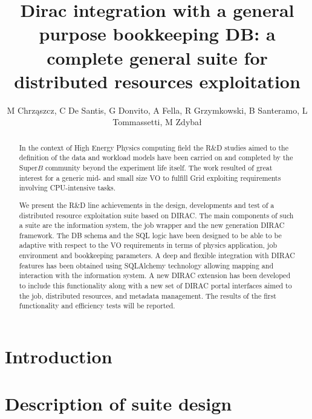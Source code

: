 \documentclass[a4paper]{jpconf}
\begin{document}
\title{Dirac integration with a general purpose bookkeeping DB: a complete general suite for distributed resources exploitation}

\author{M Chrząszcz, C De Santis, G Donvito, A Fella, R Grzymkowski, B Santeramo, L Tommassetti, M Zdybał}

%
%
%
%
%

\begin{abstract}
In the context of High Energy Physics computing field the R\&D studies aimed to
the definition of the data and workload models have been carried on and 
completed by the Super$B$ community beyond the experiment life itself.
The work resulted of great interest for a generic mid- and small size VO to 
fulfill Grid exploiting requirements involving CPU-intensive tasks.

We present the R\&D line achievements in the design, developments and test of a
distributed resource exploitation suite based on DIRAC. The main components of
such a suite are the information system, the job wrapper and the new generation
DIRAC framework. The DB schema and the SQL logic have been designed to be able
to be adaptive with respect to the VO requirements in terms of physics 
application, job environment and bookkeeping parameters. A deep and flexible 
integration with DIRAC features has been obtained using SQLAlchemy technology
allowing mapping and interaction with the information system. A new DIRAC
extension has been developed to include this functionality along with a new set
of DIRAC portal interfaces aimed to the job, distributed resources, and
metadata management. The results of the first functionality and efficiency
tests will be reported.
\end{abstract}

\section{Introduction}

\section{Description of suite design}
\end{document}
